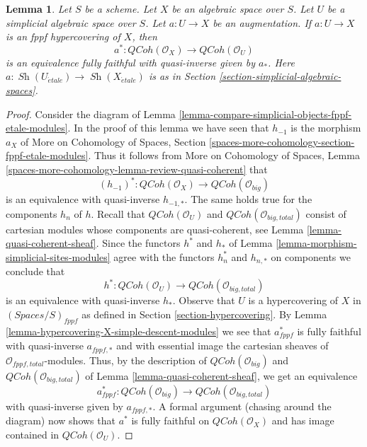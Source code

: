 \documentclass{stacks-project}
\theoremstyle{plain}
\newtheorem{lemma}[subsection]{Lemma}
\theoremstyle{definition}
\theoremstyle{remark}
\numberwithin{equation}{subsection}
\def\Sh{\mathop{\mathit{Sh}}\nolimits}
\def\etale{{\acute{e}tale}}
\def\QCoh{\mathit{QCoh}}
\begin{document}
\begin{lemma}
\label{lemma-descent-qcoh-for-fppf-hypercovering}
Let $S$ be a scheme. Let $X$ be an algebraic space over $S$.
Let $U$ be a simplicial algebraic space over $S$. Let $a : U \to X$
be an augmentation. If $a : U \to X$ is an fppf hypercovering of $X$,
then
$$
a^* : \QCoh(\mathcal{O}_X) \to \QCoh(\mathcal{O}_U)
$$
is an equivalence fully faithful with quasi-inverse given by $a_*$.
Here $a : \Sh(U_\etale) \to \Sh(X_\etale)$
is as in Section \ref{section-simplicial-algebraic-spaces}.
\end{lemma}

\begin{proof}
Consider the diagram of
Lemma \ref{lemma-compare-simplicial-objects-fppf-etale-modules}.
In the proof of this lemma we have seen that
$h_{-1}$ is the morphism $a_X$ of
More on Cohomology of Spaces, Section
\ref{spaces-more-cohomology-section-fppf-etale-modules}.
Thus it follows from
More on Cohomology of Spaces, Lemma
\ref{spaces-more-cohomology-lemma-review-quasi-coherent}
that
$$
(h_{-1})^* :
\QCoh(\mathcal{O}_X)
\longrightarrow
\QCoh(\mathcal{O}_{big})
$$
is an equivalence with quasi-inverse $h_{-1, *}$.
The same holds true for the components $h_n$ of $h$.
Recall that $\QCoh(\mathcal{O}_U)$ and $\QCoh(\mathcal{O}_{big, total})$
consist of cartesian modules whose components are quasi-coherent, see
Lemma \ref{lemma-quasi-coherent-sheaf}.
Since the functors $h^*$ and $h_*$ of
Lemma \ref{lemma-morphism-simplicial-sites-modules}
agree with the functors $h_n^*$ and $h_{n, *}$ on components
we conclude that
$$
h^* :
\QCoh(\mathcal{O}_U)
\longrightarrow 
\QCoh(\mathcal{O}_{big, total})
$$
is an equivalence with quasi-inverse $h_*$.
Observe that $U$ is a hypercovering of $X$ in $(\textit{Spaces}/S)_{fppf}$
as defined in Section \ref{section-hypercovering}.
By Lemma \ref{lemma-hypercovering-X-simple-descent-modules}
we see that $a_{fppf}^*$ is fully faithful with quasi-inverse
$a_{fppf, *}$ and with essential image the cartesian sheaves
of $\mathcal{O}_{fppf, total}$-modules.
Thus, by the description of $\QCoh(\mathcal{O}_{big})$ and
$\QCoh(\mathcal{O}_{big, total})$ of Lemma \ref{lemma-quasi-coherent-sheaf},
we get an equivalence
$$
a_{fppf}^* :
\QCoh(\mathcal{O}_{big})
\longrightarrow
\QCoh(\mathcal{O}_{big, total})
$$
with quasi-inverse given by $a_{fppf, *}$.
A formal argument (chasing around the diagram) now shows that
$a^*$ is fully faithful on $\QCoh(\mathcal{O}_X)$ and has
image contained in $\QCoh(\mathcal{O}_U)$.


\end{proof}
\end{document}
